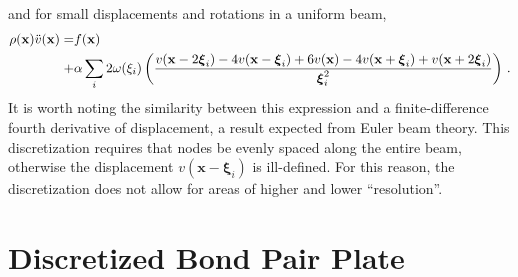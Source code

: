 and for small displacements and rotations in a uniform beam,
\begin{align}
\rho(\mathbf{x})\ddot{v}(\mathbf{x}) = &f(\mathbf{x})\notag \\
+&\alpha \sum_i 2\omega(\xi_i)\left(\frac{v(\mathbf{x}-2 \boldsymbol{\xi}_i)-4v(\mathbf{x}- \boldsymbol{\xi}_i)+6v(\mathbf{x})-4v(\mathbf{x}+ \boldsymbol{\xi}_i)+v(\mathbf{x}+2 \boldsymbol{\xi}_i)}{ \boldsymbol{\xi}_i^2}\right)\, . \notag
\end{align}
It is worth noting the similarity between this expression and a finite-difference fourth derivative of displacement, a result expected from Euler beam theory.
This discretization requires that nodes be evenly spaced along the entire beam, otherwise the displacement \(v(\mathbf{x}- \boldsymbol{\xi}_i)\) is ill-defined. 
For this reason, the discretization does not allow for areas of higher and lower ``resolution''. 

\section{Discretized Bond Pair Plate}

